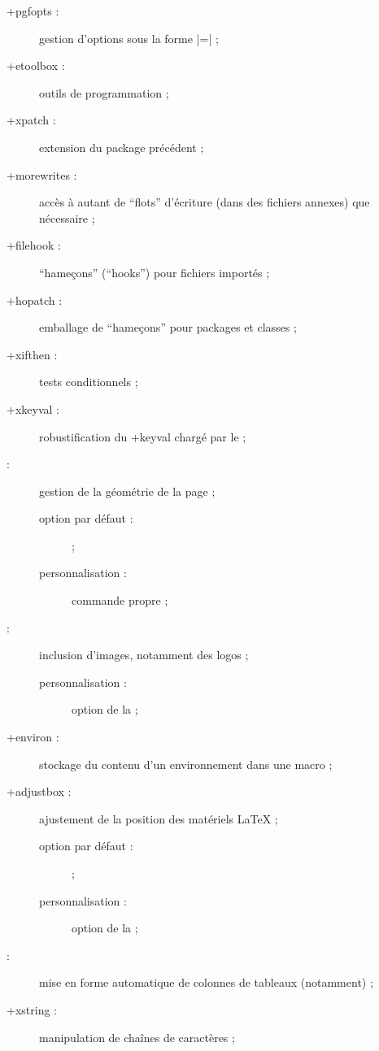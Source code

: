 \begin{description}
\item[\package*+{pgfopts} :] gestion d'options sous la forme
  |=| ;
\item[\package*+{etoolbox} :] outils de programmation ;
\item[\package*+{xpatch} :] extension du package précédent ;
\item[\package*+{morewrites} :] accès à autant de \enquote{flots} d'écriture
  (dans des fichiers annexes) que nécessaire ;
\item[\package*+{filehook} :] \enquote{hameçons} (\foreignquote{english}{hooks})
  pour fichiers importés ;
\item[\package*+{hopatch} :] emballage de \enquote{hameçons} pour packages et
  classes ;
\item[\package*+{xifthen} :] tests conditionnels ;
\item[\package*+{xkeyval} :] robustification du \Package+{keyval} chargé par le
   ;
\item[ :] gestion de la géométrie de la page ;
  \begin{description}
  \item[option par défaut :]  ;
  \item[personnalisation :] commande propre  ;
  \end{description}
\item[ :] inclusion d'images, notamment des logos ;
  \begin{description}
  \item[personnalisation :] option  de la \yatCl{} ;
  \end{description}
\item[\package*+{environ} :] stockage du contenu d'un environnement dans une
  macro ;
\item[\package+{adjustbox} :] ajustement de la position des matériels
  \LaTeX{} ;
  \begin{description}
  \item[option par défaut :]  ;
  \item[personnalisation :] option  de la \yatCl{} ;
  \end{description}
\item[ :] mise en forme automatique de colonnes de tableaux
  (notamment) ;
\item[\package*+{xstring} :] manipulation de chaînes de caractères ;

\end{description}
